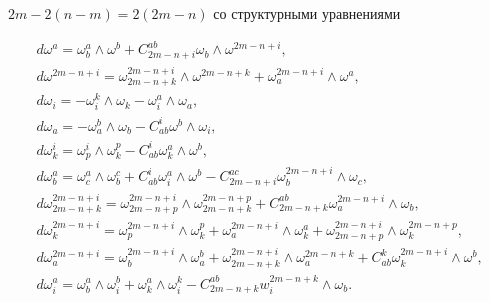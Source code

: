 $2m - 2(n - m) = 2(2m - n)$ со структурными уравнениями


\begin{equation}


\label{eq9}


\begin{array}{l}


d\omega^a=\omega^a_b\wedge \omega^b+C^{ab}_{2m-n+i}\omega_b\wedge


\omega^{2m-n+i},\\


%


d\omega^{2m-n+i}=\omega^{2m-n+i}_{2m-n+k}\wedge \omega^{2m-


n+k}+\omega^{2m-n+i}_a\wedge \omega^a,\\


%


d\omega_i=-\omega^k_i\wedge \omega_k-\omega^a_i\wedge \omega_a,\\


%


d\omega_a=-\omega^b_a\wedge \omega_b-C^i_{ab}\omega^b\wedge \omega_i,\\


%


d\omega^i_k=\omega^i_p\wedge \omega^p_k-C^i_{ab}\omega^a_k\wedge


\omega^b,\\


%


d\omega^a_b=\omega^a_c\wedge \omega^c_b+C^i_{ab}\omega^a_i\wedge


\omega^b-C^{ac}_{2m-n+i}\omega^{2m-n+i}_b\wedge \omega_c,\\


%


d\omega^{2m-n+i}_{2m-n+k}=\omega^{2m-n+i}_{2m-n+p}\wedge \omega^{2m-


n+p}_{2m-n+k}+ C^{ab}_{2m-n+k} \omega^{2m-n+i}_a\wedge \omega_b,\\


%


d\omega^{2m-n+i}_k=\omega^{2m-n+i}_p\wedge \omega^p_k+\omega^{2m-


n+i}_a\wedge \omega^a_k+\omega^{2m-n+i}_{2m-n+p}\wedge \omega^{2m-


n+p}_k,\\


%


d\omega^{2m-n+i}_a=\omega^{2m-n+i}_b\wedge \omega^b_a+\omega^{2m-


n+i}_{2m-n+k}\wedge \omega^{2m-n+k}_a+C^k_{ab}\omega^{2m-n+i}_k\wedge


\omega^b,\\


%


d\omega^a_i=\omega^a_b\wedge \omega^b_i+\omega^a_k\wedge \omega^k_i-


C^{ab}_{2m-n+k}w^{2m-n+k}_i\wedge \omega_b.


\end{array}


\end{equation}





